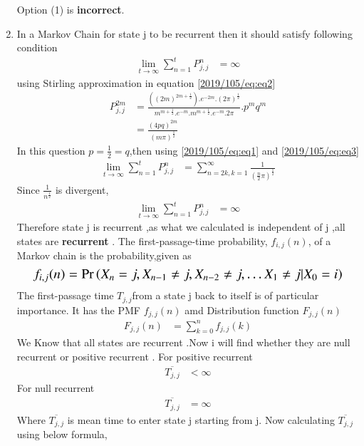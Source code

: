 \begin{enumerate}
    Option (1) is \textbf{incorrect}. 
    \item 
In a Markov Chain for state j to be recurrent then it should satisfy following condition
\begin{align}
     \lim_{t\to\infty}\sum_{n=1}^t P_{j,j}^{n}&=\infty
\end{align}
using Stirling approximation in equation \eqref{2019/105/eq:eq2} 
\begin{align}
    P_{j,j}^{2m} &=\frac{((2m)^{2m +\frac{1}{2}}).e^{-2m}.(2\pi)^{\frac{1}{2}}}{m^{m+\frac{1}{2}}.e^{-m}.m^{m+\frac{1}{2}}.e^{-m}.2\pi}.p^{m}q^{m}
    \\
    &=\frac{(4pq)^{2m}}{(m\pi)^{\frac{1}{2}}}
    \label{2019/105/eq:eq3}
\end{align}
In this question $p =\frac{1}{2}=q$,then using \eqref{2019/105/eq:eq1} and \eqref{2019/105/eq:eq3}
\begin{align}
    \lim_{t\to\infty}\sum_{n=1}^t P_{j,j}^{n}&=\sum_{n=2k,k=1}^{\infty}\frac{1}{(\frac{n}{2}\pi)^{\frac{1}{2}}}
\end{align}
Since $\frac{1}{n^{\frac{1}{2}}}$ is divergent,
\begin{align}
     \lim_{t\to\infty}\sum_{n=1}^t P_{j,j}^{n}& = \infty
\end{align}
Therefore state j is recurrent ,as what we calculated is independent of j ,all states are \textbf{recurrent }.
The first-passage-time probability, $f_{i,j}(n)$, of a Markov chain is the probability,given as 
\begin{equation}
\resizebox{.9\hsize}{!}{$f_{i,j}(n)=\pr{X_{n}=j,X_{n-1}\neq j,X_{n-2}\neq j,\dots X_{1}\neq j|X_{0}=i}$}
\end{equation}
The first-passage time $T_{j,j}$from a state j back to itself is of particular importance. It has the PMF $f_{j,j}(n)$ amd Distribution function $F_{j,j}(n)$
\begin{align}
    F_{j,j}(n)&=\sum_{k=0}^n f_{j,j}(k)
    \label{2019/105/eq:eq4}
\end{align}
We Know that all states are recurrent .Now i will find whether they are null recurrent or positive recurrent .
For positive recurrent 
\begin{align}
    \overline{T_{j,j}}& < \infty
\end{align}
For null recurrent 
\begin{align}
    \overline{T_{j,j}}& = \infty
\end{align}
Where $\overline{T_{j,j}}$ is mean time to enter state j starting from j.
Now calculating $\overline{T_{j,j}}$ using below formula,

\end{enumerate}
